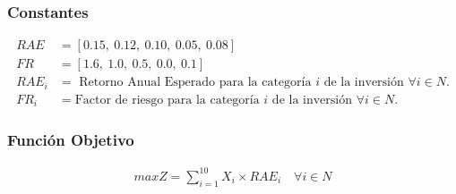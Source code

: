 \documentclass[a4paper,12pt]{article}
\begin{document}
\subsubsection{Constantes}
\begin{equation*}
\begin{split}
	RAE &= [0.15,\ 0.12,\ 0.10,\ 0.05,\ 0.08] \\
	FR & = [1.6,\ 1.0,\ 0.5,\ 0.0,\ 0.1] \\
	RAE_i &= \text{ Retorno Anual Esperado para la categoría } i \text{ de la inversión } \forall i \in N. \\
	FR_i &= \text{Factor de riesgo para la categoría } i \text{ de la inversión } \forall i \in N.
\end{split}
\end{equation*}
\subsubsection{Función Objetivo}
\begin{equation*}
\begin{split}
	maxZ = \sum_{i = 1}^{10}X_i\times RAE_i \quad \forall i \in N
\end{split}
\end{equation*}
\end{document}

